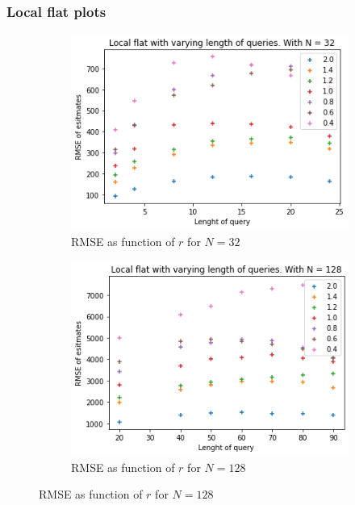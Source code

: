 \documentclass[11pt]{article}
\theoremstyle{definition}
\begin{document}
\subsubsection{Local flat plots}\label{app:loc_r}
\begin{figure}[H]
\centering
\begin{subfigure}{.4\textwidth}
  \centering
  \includegraphics[width=\linewidth]{figures/local_flat/varying_r/loc_flat_varying_length_N=32.png}
  \caption{RMSE as function of $r$ for $N=32$}
  \label{fig:15}
\end{subfigure}%
\begin{subfigure}{.4\textwidth}
  \centering
  \includegraphics[width=\linewidth]{figures/local_flat/varying_r/loc_flat_varying_length_N=128.png}
  \caption{RMSE as function of $r$ for $N=128$}
  \label{fig:16}
\end{subfigure}

\end{figure}
\end{document}
